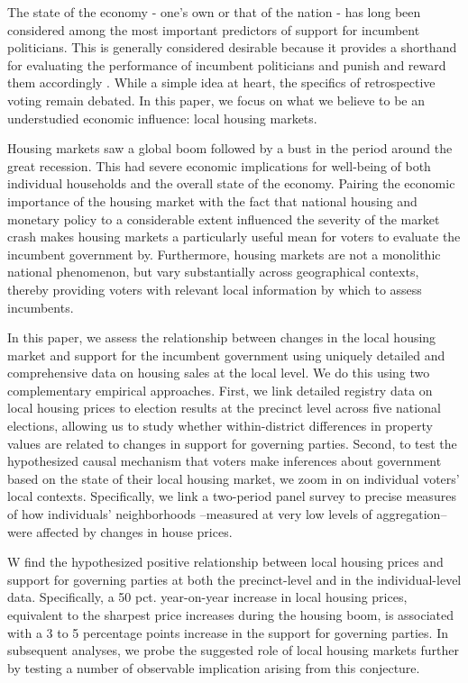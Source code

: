 \documentclass[12pt,a4paper]{article}
\begin{document}
The state of the economy - one’s own or that of the nation - has long been considered among the most important predictors of support for incumbent politicians. This is generally considered desirable because it provides a shorthand for evaluating the performance of incumbent politicians and punish and reward them accordingly \citep{ashworth2012electoral,healy2013retrospective}. While a simple idea at heart, the specifics of retrospective voting remain debated. In this paper, we focus on what we believe to be an understudied economic influence: local housing markets. 

Housing markets saw a global boom followed by a bust in the period around the great recession. This had severe economic implications for well-being of both individual households and the overall state of the economy. Pairing the economic importance of the housing market with the fact that national housing and monetary policy to a considerable extent influenced the severity of the market crash makes housing markets a particularly useful mean for voters to evaluate the incumbent government by. Furthermore, housing markets are not a monolithic national phenomenon, but vary substantially across geographical contexts, thereby providing voters with relevant local information by which to assess incumbents. 

In this paper, we assess the relationship between changes in the local housing market and support for the incumbent government using uniquely detailed and comprehensive data on housing sales at the local level. We do this using two complementary empirical approaches. First, we link detailed registry data on local housing prices to election results at the precinct level across five national elections, allowing us to study whether within-district differences in property values are related to changes in support for governing parties. Second, to test the hypothesized causal mechanism that voters make inferences about government based on the state of their local housing market, we zoom in on individual voters' local contexts. Specifically, we link a two-period panel survey to precise measures of how individuals' neighborhoods --measured at very low levels of aggregation-- were affected by changes in house prices.

W find the hypothesized positive relationship between local housing prices and support for governing parties at both the precinct-level and in the individual-level data. Specifically, a 50 pct. year-on-year increase in local housing prices, equivalent to the sharpest price increases during the housing boom, is associated with a 3 to 5 percentage points increase in the support for governing parties. In subsequent analyses, we probe the suggested role of local housing markets further by testing a number of observable implication arising from this conjecture. 
\end{document}
